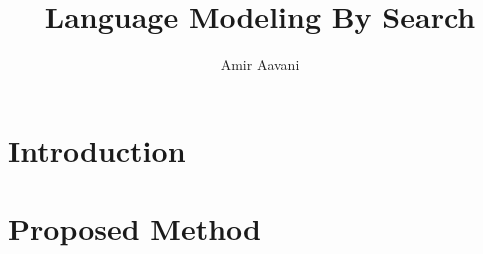\documentclass[
anonymous,
]{jlm}
\begin{document}
\title{Language Modeling By Search}



\author{Amir Aavani
}


\affiliation{%
}





\maketitle              %

\begin{abstract}

\end{abstract}

\section{Introduction}


\section{Proposed Method}




\end{document}
